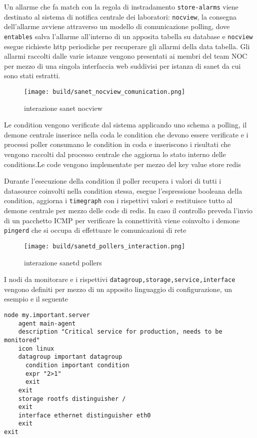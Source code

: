\documentclass[12pt,a4paper,twoside,openright]{book}
\begin{document}
Un allarme che fa match con la regola di instradamento \verb|store-alarms| viene destinato al sistema di notifica centrale dei laboratori: \verb|nocview|, la consegna dell'allarme avviene attraverso un modello di comunicazione polling, dove \verb|entables| salva l'allarme all'interno di un apposita tabella su database e \verb|nocview| esegue richieste http periodiche per recuperare gli allarmi della data tabella.
Gli allarmi raccolti dalle varie istanze vengono presentati ai membri del team NOC per mezzo di una singola interfaccia web suddivisi per istanza di sanet da cui sono stati estratti.

\begin{figure}[H]
    \centering
    \texttt{[image: build/sanet\_nocview\_comunication.png]}
    \caption{interazione sanet nocview}
    \label{fig:enter-label}
\end{figure}

Le condition vengono verificate dal sistema applicando uno schema a polling, il demone centrale inserisce nella coda le condition che devono essere verificate e i processi poller consumano le condition in coda e inseriscono i risultati che vengono raccolti dal processo centrale che aggiorna lo stato interno delle conditions.Le code vengono implementate per mezzo del key value store redis

Durante l'esecuzione della condition il poller recupera i valori di tutti i datasource coinvolti nella condition stessa, esegue l'espressione booleana della condition, aggiorna i \verb|timegraph| con i rispettivi valori e restituisce tutto al demone centrale per mezzo delle code di redis. In caso il controllo preveda l'invio di un pacchetto ICMP per verificare la connettività viene coinvolto i demone \verb|pingerd| che si occupa di effettuare le comunicazioni di rete

\begin{figure}[H]
    \centering
    \texttt{[image: build/sanetd\_pollers\_interaction.png]}
    \caption{interazione sanetd pollers}
    \label{fig:enter-label}
\end{figure}

I nodi da monitorare e i rispettivi \verb|datagroup,storage,service,interface| vengono definiti per mezzo di un apposito linguaggio di configurazione, un esempio e il seguente

\begin{lstlisting}
node my.important.server
    agent main-agent
    description "Critical service for production, needs to be monitored"
    icon linux
    datagroup important datagroup
      condition important condition
      expr "2>1"
      exit
    exit
    storage rootfs distinguisher /
    exit
    interface ethernet distinguisher eth0
    exit
exit
\end{lstlisting}
\end{document}
